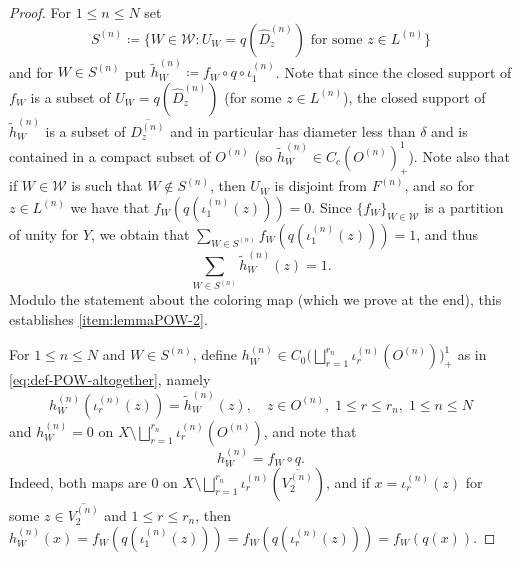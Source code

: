 \documentclass[11pt,a4paper]{amsart}
\theoremstyle{definition}
\numberwithin{equation}{section}
\newcommand{\mc}[1]{\mathcal{#1}}
\begin{document}
\begin{proof}
For $1\le n\le N$ set 
\[
S^{(n)}\coloneqq \big\{W\in\mathcal{W}: U_W=q(\hat{D}_z^{(n)})\text{ for some }z\in L^{(n)}\big\}
\]
and for $W\in S^{(n)}$ put $\tilde{h}_W^{(n)}\coloneqq f_W\circ q\circ \iota_1^{(n)}$. Note that since the closed support of $f_W$ is a subset of $U_W=q(\hat{D}_z^{(n)})$ (for some $z\in L^{(n)}$), the closed support of $\tilde{h}_W^{(n)}$ is a subset of $\overline{D_z^{(n)}}$ and in particular has diameter less than $\delta$ and is contained in a compact subset of $O^{(n)}$ (so $\tilde{h}_W^{(n)} \in C_c(O^{(n)})_+^1$). Note also that if $W\in\mc{W}$ is such that $W\not\in S^{(n)}$, then $U_W$ is disjoint from $F^{(n)}$, and so for $z\in L^{(n)}$ we have that $f_W(q(\iota_1^{(n)}(z)))=0$. Since $\{f_W\}_{W\in \mc{W}}$ is a partition of unity for $Y$, we obtain that $\sum_{W\in S^{(n)}}f_W(q(\iota_1^{(n)}(z)))=1$, and thus
\begin{equation}
\sum_{W\in S^{(n)}}\tilde{h}_W^{(n)}(z)=1.
\end{equation}
Modulo the statement about the coloring map (which we prove at the end), this establishes \ref{item:lemmaPOW-2}. 

For $1\le n\le N$ and $W\in S^{(n)}$, define $h_W^{(n)}\in C_0\big(\bigsqcup_{r=1}^{r_n}\iota_r^{(n)}(O^{(n)})\big)_+^1$ as in \eqref{eq:def-POW-altogether}, namely 
\begin{equation}
h_W^{(n)}(\iota_r^{(n)}(z))=\tilde{h}_W^{(n)}(z),\quad z\in O^{(n)},\; 1\le r\le r_n,\; 1\le n\le N
\end{equation}
and $h_W^{(n)}=0$ on $X\setminus\bigsqcup_{r=1}^{r_n}\iota_r^{(n)}(O^{(n)})$, and note that 
\begin{equation}\label{eq:notethistoo}
h_W^{(n)}=f_W\circ q.
\end{equation}
Indeed, both maps are $0$ on  $X\setminus \bigsqcup_{r=1}^{r_n}\iota_r^{(n)}(\overline{V_2^{(n)}})$, and if $x=\iota_r^{(n)}(z)$ for some $z\in \overline{V_2^{(n)}}$ and $1\le r\le r_n$, then $h_W^{(n)}(x)=f_W(q(\iota_1^{(n)}(z)))=f_W(q(\iota_r^{(n)}(z)))=f_W(q(x))$.


\end{proof}
\end{document}
